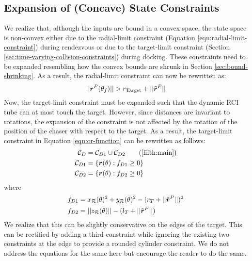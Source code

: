 \subsection{Expansion of (Concave) State Constraints}
We realize that, although the inputs are bound in a convex space, the state space is non-convex either due to the radial-limit constraint (Equation \ref{eqn:radial-limit-constraint}) during rendezvous or due to the target-limit constraint (Section \ref{sec:time-varying-collision-constraints}) during docking.
These constraints need to be expanded resembling how the convex bounds are shrunk in Section \ref{sec:bound-shrinking}.
As a result, the radial-limit constraint can now be rewritten as:
\begin{align}
    ||\boldsymbol{r}^P(\theta_f)||>r_{\text{Target}}+||\Tilde{\boldsymbol{r}}^P|| \label{eqn:expanded-radial-limit-constraint}
\end{align}
Now, the target-limit constraint must be expanded such that the dynamic RCI tube can at most touch the target.
However, since distances are invariant to rotations, the expansion of the constraint is not affected by the rotation of the position of the chaser with respect to the target.
As a result, the target-limit constraint in Equation \ref{eqn:or-function} can be rewritten as follows:
\begin{subequations}\label{fifth:main}
\begin{align}
    {\mathcal{C}}_D&={\mathcal{C}}_{D1}\cup{\mathcal{C}}_{D2}\label{eqn:expanded-target-limit-constraint}\tag{\ref{fifth:main}}\\
    {\mathcal{C}}_{D1}&=\{\boldsymbol{r}(\theta):f_{D1}\geq0\}\\
    {\mathcal{C}}_{D2}&=\{\boldsymbol{r}(\theta):f_{D2}\geq0\}
\end{align}
\end{subequations}
where
\begin{subequations}
\begin{align}
    f_{D1}&=x_{\mathcal{R}}(\theta)^2 + y_{\mathcal{R}}(\theta)^2 - (r_T+||\Tilde{\boldsymbol{r}}^P||)^2\\
    f_{D2}&=||z_{\mathcal{R}}(\theta)|| - (l_T+||\Tilde{\boldsymbol{r}}^P||)
\end{align}
\end{subequations}
We realize that this can be slightly conservative on the edges of the target.
This can be rectified by adding a third constraint while ignoring the existing two constraints at the edge to provide a rounded cylinder constraint.
We do not address the equations for the same here but encourage the reader to do the same.
